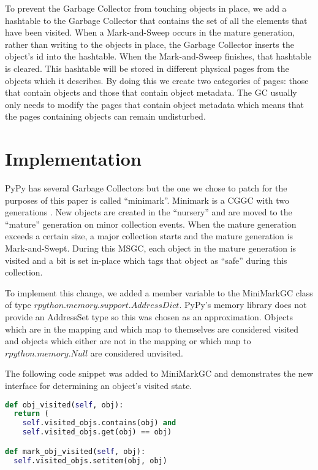 \documentclass{article}
\begin{document}
\begin{sloppypar}
To prevent the Garbage Collector from touching objects in place, we add a hashtable to the Garbage Collector that contains the set of all the elements that have been visited.  When a Mark-and-Sweep occurs in the mature generation, rather than writing to the objects in place, the Garbage Collector inserts the object's id into the hashtable.  When the Mark-and-Sweep finishes, that hashtable is cleared.  This hashtable will be stored in different physical pages from the objects which it describes.  By doing this we create two categories of pages: those that contain objects and those that contain object metadata.  The GC usually only needs to modify the pages that contain object metadata which means that the pages containing objects can remain undisturbed.  

\section{Implementation}\label{sec:implementation}

PyPy has several Garbage Collectors but the one we chose to patch for the purposes of this paper is called ``minimark''.  Minimark is a CGGC with two generations \cite{pypy-doc}.  New objects are created in the ``nursery'' and are moved to the ``mature'' generation on minor collection events.  When the mature generation exceeds a certain size, a major collection starts and the mature generation is Mark-and-Swept.  During this MSGC, each object in the mature generation is visited and a bit is set in-place which tags that object as ``safe'' during this collection.  

To implement this change, we added a member variable to the MiniMarkGC class of type $rpython.memory.support.AddressDict$.  PyPy's memory library does not provide an AddressSet type so this was chosen as an approximation.  Objects which are in the mapping and which map to themselves are considered visited and objects which either are not in the mapping or which map to $rpython.memory.Null$ are considered unvisited.  

The following code snippet was added to MiniMarkGC and demonstrates the new interface for determining an object's visited state.

\begin{lstlisting}[language=python]
def obj_visited(self, obj):
  return (
    self.visited_objs.contains(obj) and
    self.visited_objs.get(obj) == obj)

def mark_obj_visited(self, obj):
  self.visited_objs.setitem(obj, obj)


\end{lstlisting}
\end{sloppypar}
\end{document}

